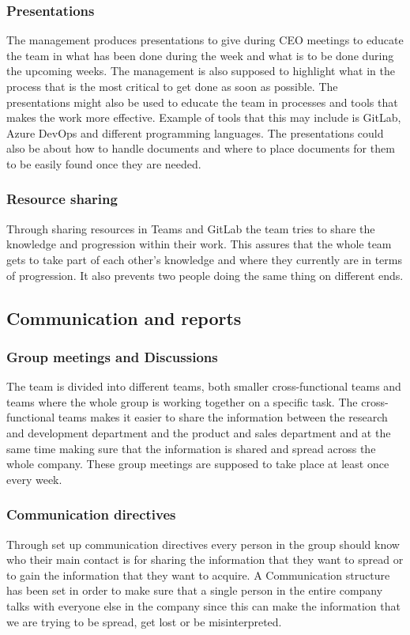 \subsubsection{Presentations}
The management produces presentations to give during CEO meetings to educate the team in what has been done during the week and what is to be done during the upcoming weeks. The management is also supposed to highlight what in the process that is the most critical to get done as soon as possible. The presentations might also be used to educate the team in processes and tools that makes the work more effective. Example of tools that this may include is GitLab, Azure DevOps and different programming languages. The presentations could also be about how to handle documents and where to place documents for them to be easily found once they are needed. 

\subsubsection{Resource sharing}
Through sharing resources in Teams and GitLab the team tries to share the knowledge and progression within their work. This assures that the whole team gets to take part of each other’s knowledge and where they currently are in terms of progression. It also prevents two people doing the same thing on different ends. 

\subsection{Communication and reports}
\subsubsection{Group meetings and Discussions}
The team is divided into different teams, both smaller cross-functional teams and teams where the whole group is working together on a specific task. The cross-functional teams makes it easier to share the information between the research and development department and the product and sales department and at the same time making sure that the information is shared and spread across the whole company. These group meetings are supposed to take place at least once every week.  

\subsubsection{Communication directives}
Through set up communication directives every person in the group should know who their main contact is for sharing the information that they want to spread or to gain the information that they want to acquire. A Communication structure has been set in order to make sure that a single person in the entire company talks with everyone else in the company since this can make the information that we are trying to be spread, get lost or be misinterpreted.   

